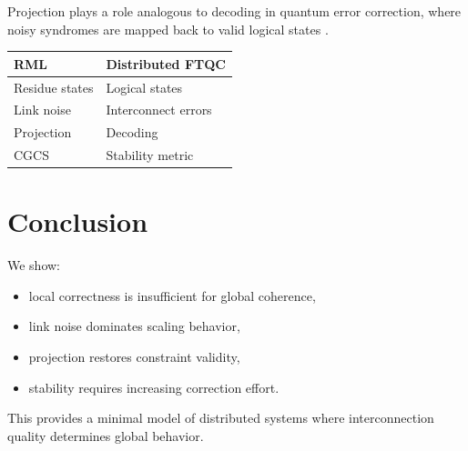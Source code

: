 \documentclass[11pt]{article}
\begin{document}
Projection plays a role analogous to decoding in quantum error correction, where noisy syndromes are mapped back to valid logical states \cite{gottesman2010}.

\begin{center}
\begin{tabular}{ll}
\toprule
RML & Distributed FTQC \\
\midrule
Residue states & Logical states \\
Link noise & Interconnect errors \\
Projection & Decoding \\
CGCS & Stability metric \\
\bottomrule
\end{tabular}
\end{center}

\section{Conclusion}

We show:

\begin{itemize}[leftmargin=*]
\item local correctness is insufficient for global coherence,
\item link noise dominates scaling behavior,
\item projection restores constraint validity,
\item stability requires increasing correction effort.
\end{itemize}

This provides a minimal model of distributed systems where interconnection quality determines global behavior.



\end{document}
